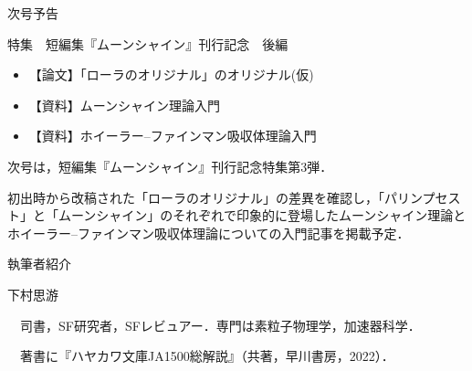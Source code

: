 \documentclass[10pt, a5paper, twoside]{jsarticle}
\theoremstyle{definition}
\begin{document}
	\begin{center}

		{\Large 次号予告}

			\vspace{10mm}

		特集　短編集『ムーンシャイン』刊行記念　後編

			\vspace{3mm}

		\begin{itemize}

			\item 【論文】「ローラのオリジナル」のオリジナル(仮)

				\vspace{3mm}

			\item 【資料】ムーンシャイン理論入門

				\vspace{3mm}

			\item 【資料】ホイーラー--ファインマン吸収体理論入門

				\vspace{3mm}
		
		\end{itemize}


	\end{center}

	\vspace{15mm}

	\begin{screen}
		
		次号は，短編集『ムーンシャイン』刊行記念特集第3弾．

		初出時から改稿された「ローラのオリジナル」の差異を確認し，「パリンプセスト」と「ムーンシャイン」のそれぞれで印象的に登場したムーンシャイン理論とホイーラー--ファインマン吸収体理論についての入門記事を掲載予定．

	\end{screen}

	\newpage

	{\large 執筆者紹介}

	\vspace{3mm}

	下村思游

	　司書，SF研究者，SFレビュアー．専門は素粒子物理学，加速器科学．

	　著書に『ハヤカワ文庫JA1500総解説』（共著，早川書房，2022）．
\end{document}
